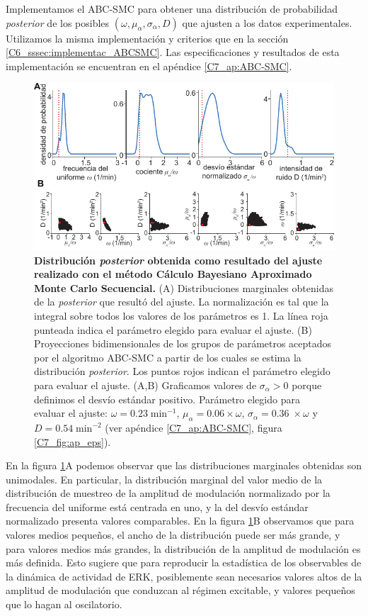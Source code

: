 \documentclass[./main.tex]{subfiles}
\begin{document}
Implementamos el ABC-SMC para obtener una distribución de probabilidad \textit{posterior} de los posibles $(\omega,\mu_{\alpha},\sigma_{\alpha},D)$ que ajusten a los datos experimentales. Utilizamos la misma implementación y criterios que en la sección \ref{C6_sssec:implementac_ABCSMC}. Las especificaciones y resultados de esta implementación se encuentran en el apéndice \ref{C7_ap:ABC-SMC}.


\begin{figure}
    \centering
    \includegraphics[width=1\columnwidth]{figures/chapter7/C7_dist_fit.pdf} 
    \caption{\textbf{Distribución \textit{posterior} obtenida como resultado del ajuste realizado con el método Cálculo Bayesiano Aproximado Monte Carlo Secuencial.} (A) Distribuciones marginales obtenidas de la \textit{posterior} que resultó del ajuste. La normalización es tal que la integral sobre todos los valores de los parámetros es 1. La línea roja punteada indica el parámetro elegido para evaluar el ajuste. (B) Proyecciones bidimensionales de los grupos de parámetros aceptados por el algoritmo ABC-SMC a partir de los cuales se estima la distribución \textit{posterior}. Los puntos rojos indican el parámetro elegido para evaluar el ajuste. (A,B) Graficamos valores de $\sigma_{\alpha}  > 0$ porque definimos el desvío estándar positivo. Parámetro elegido para evaluar el ajuste: $\omega = 0.23 \; \text{min}^{-1}$, $\mu_{\alpha} = 0.06 \times \omega$, $ \sigma_{\alpha} = 0.36 \;  \times \omega $ y $D = 0.54 \;\text{min}^{-2}$ (ver apéndice \ref{C7_ap:ABC-SMC}, figura \ref{C7_fig:ap_eps}).}
    \label{C7_fig:dist_fit}
\end{figure} 


En la figura \ref{C7_fig:dist_fit}A podemos observar que las distribuciones marginales obtenidas son unimodales. En particular, la distribución marginal del valor medio de la distribución de muestreo de la amplitud de modulación normalizado por la frecuencia del uniforme está centrada en uno, y la del desvío estándar normalizado presenta valores comparables. En la figura \ref{C7_fig:dist_fit}B observamos que para valores medios pequeños, el ancho de la distribución puede ser más grande, y para valores medios más grandes, la distribución de la amplitud de modulación es más definida. Esto sugiere que para reproducir la estadística de los observables de la dinámica de actividad de ERK, posiblemente sean necesarios valores altos de la amplitud de modulación que conduzcan al régimen excitable, y valores pequeños que lo hagan al oscilatorio.  
\end{document}
